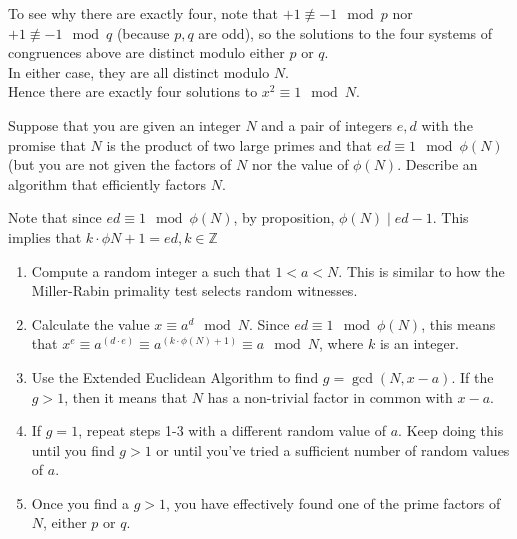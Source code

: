 \documentclass[12pt]{article}
\begin{document}
\noindent
To see why there are exactly four, note that $+1\not\equiv-1\mod{p}$ nor $+1\not\equiv-1\mod{q}$ (because $p,q$ are odd), so the solutions to the four systems of congruences above are distinct modulo either $p$ or $q$.\\
In either case, they are all distinct modulo $N$.\\
Hence there are exactly four solutions to $x^2\equiv 1\mod{N}$.

\newpage
\problem Suppose that you are given an integer $N$ and a pair of integers $e,d$ with the promise that $N$ is the product of two large primes and that $ed\equiv1\mod{\phi(N)}$ (but you are not given the factors of $N$ nor the value of $\phi(N)$. Describe an algorithm that efficiently factors $N$.

\solution Note that since $ed\equiv 1\mod{\phi(N)}$, by proposition, $\phi(N)\mid ed-1$. This implies that $k\cdot\phi{N}+1=ed,k\in\mathbb{Z}$

\begin{enumerate}
    \item Compute a random integer a such that $1<a<N$. This is similar to how the Miller-Rabin primality test selects random witnesses.
    \item Calculate the value $x\equiv a^d\mod{N}$. Since $ed\equiv1\mod{\phi{(N)}}$, this means that $x^e\equiv a^{(d\cdot e)}\equiv a^{(k\cdot\phi(N)+1)}\equiv a\mod{N}$, where $k$ is an integer.

    \item Use the Extended Euclidean Algorithm to find $g=\gcd(N,x-a)$. If the $g>1$, then it means that $N$ has a non-trivial factor in common with $x-a$.

    \item If $g=1$, repeat steps 1-3 with a different random value of $a$. Keep doing this until you find $g>1$ or until you've tried a sufficient number of random values of $a$.

    \item Once you find a $g>1$, you have effectively found one of the prime factors of $N$, either $p$ or $q$.
\end{enumerate}
\end{document}
